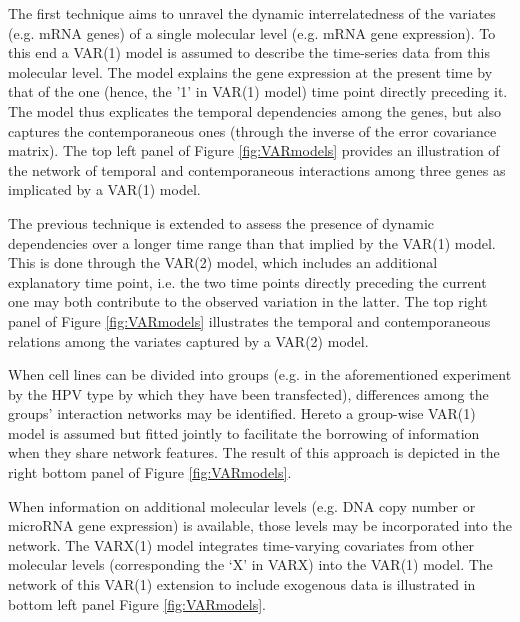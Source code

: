 \begin{compactitem}
\item The first technique aims to unravel the dynamic interrelatedness of the variates (e.g. mRNA genes) of a single molecular level (e.g. mRNA gene expression). To this end a VAR(1) model is assumed to describe the time-series data from this molecular level. The model explains the gene expression at the present time by that of the one (hence, the '1' in VAR(1) model) time point directly preceding it. The model thus explicates the temporal dependencies among the genes, but also captures the contemporaneous ones (through the inverse of the error covariance matrix). The top left panel of Figure \ref{fig:VARmodels} provides an illustration of the network of temporal and contemporaneous interactions among three genes as implicated by a VAR(1) model. 

\item The previous technique is extended to assess the presence of dynamic dependencies over a longer time range than that implied by the VAR(1) model. This is done through the VAR(2) model, which includes an additional explanatory time point, i.e. the two time points directly preceding the current one may both contribute to the observed variation in the latter. The top right panel of Figure \ref{fig:VARmodels} illustrates the temporal and contemporaneous relations among the variates captured by a VAR(2) model. 

\item When cell lines can be divided into groups (e.g. in the aforementioned experiment by the HPV type by which they have been transfected), differences among the groups' interaction networks may be identified. Hereto a group-wise VAR(1) model is assumed but fitted jointly to facilitate the borrowing of information when they share network features. The result of this approach is depicted in the right bottom panel of Figure \ref{fig:VARmodels}.



\item When information on additional molecular levels (e.g. DNA copy number or microRNA gene expression) is available, those levels may be incorporated into the network. The VARX(1) model integrates time-varying covariates from other molecular levels (corresponding the `X' in VARX) into the VAR(1) model. The network of this VAR(1) extension to include exogenous data is illustrated in bottom left panel Figure \ref{fig:VARmodels}.




\end{compactitem}
